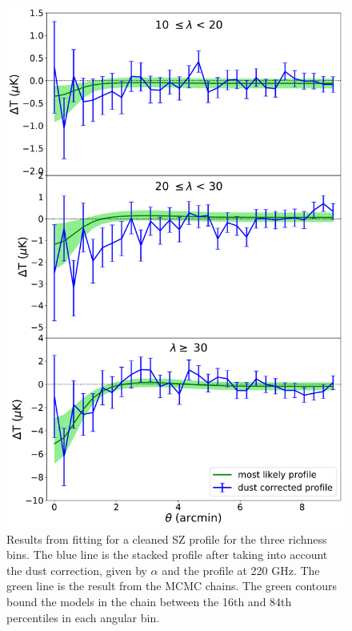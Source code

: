 \documentclass[a4paper,fleqn,usenatbib]{mnras}
\begin{document}
\begin{figure}
  \centering
  \includegraphics[width=0.5 \textwidth]{MLprof_ncut_all.pdf}
  \caption{Results from fitting for a cleaned SZ profile for the three richness bins. The blue line is the stacked profile after taking into account the dust correction, given by $\alpha$ and the profile at 220 GHz. The green line is the result from the MCMC chains. The green contours bound the models in the chain between the 16th and 84th percentiles in each angular bin.}
  \label{fig:mcmcprof}
\end{figure}


\end{document}
